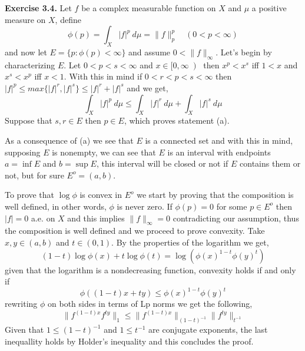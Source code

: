 \documentclass{article}
\begin{document}
\bigbreak

\begin{exercise}\textbf{Exercise 3.4.}
    Let $f$ be a complex measurable function on $X$ and $\mu$ a positive measure on $X$, define
    \[
        \phi \left( p \right) = \int_X |f|^p\: d\mu = \|f\|_p^p \quad \left( 0 < p < \infty \right) 
    \]
    and now let $E = \{p: \phi \left( p \right) < \infty\}$ and assume $0 < \|f\|_\infty$. Let's begin by characterizing $E$. Let $0<p<s<\infty$ and $x \in [0, \infty \left)$ then $x^p < x^s$ iff $1 < x$ and $x^s < x^p$ iff $x < 1$. With this in mind if $0<r<p<s<\infty$ then $|f|^p \le max\{|f|^r,|f|^s\} \le |f|^r+|f|^s$ and we get,
    \[
        \int_X |f|^p\: d\mu \le \int_X |f|^r\: d\mu + \int_X |f|^s\: d\mu 
    \]
    Suppose that $s,r \in E$ then $p \in E$, which proves statement (a).

\bigbreak

    As a consequence of (a) we see that $E$ is a connected set and with this in mind, supposing $E$ is nonempty, we can see that $E$ is an interval with endpoints $a= \inf E$ and $b = \sup E$, this interval will be closed or not if $E$ contains them or not, but for sure $E^o= \left( a,b \right) $.

\bigbreak

    To prove that $\log \phi$ is convex in $E^o$ we start by proving that the composition is well defined, in other words, $\phi$ is never zero. If $\phi \left( p \right) = 0$ for some $p \in E^o $ then $|f|=0$ a.e. on $X$ and this implies $\|f\|_\infty = 0$ contradicting our assumption, thus the composition is well defined and we proceed to prove convexity. Take $x,y \in \left( a,b \right) $ and $t \in \left( 0,1 \right) $. By the properties of the logarithm we get,
    \[
        \left( 1-t \right) \log \phi \left( x \right) + t \log \phi \left( t \right) = \log \left( \phi \left( x\right)^{1-t} \phi \left( y \right)^t \right) 
    \]
    given that the logarithm is a nondecreasing function, convexity holds if and only if
    \[
        \phi \left( (1-t)x + ty \right) \le \phi \left( x \right)^{1-t} \phi \left( y \right)^t
    \]
    rewriting $\phi$ on both sides in terms of Lp norms we get the following,
    \[
        \|f^{ \left( 1-t \right) x} f^{ty}\|_1 \le \|f^{ \left( 1-t \right) x}\|_ {\left( 1-t \right)^{-1} } \|f^{ty}\|_{t^{-1}}   
    \]
    Given that $1 \le \left( 1-t \right)^{-1}$ and $1 \le  t^{-1} $ are conjugate exponents, the last inequallity holds by Holder's inequality and this concludes the proof.


\end{exercise}
\end{document}
